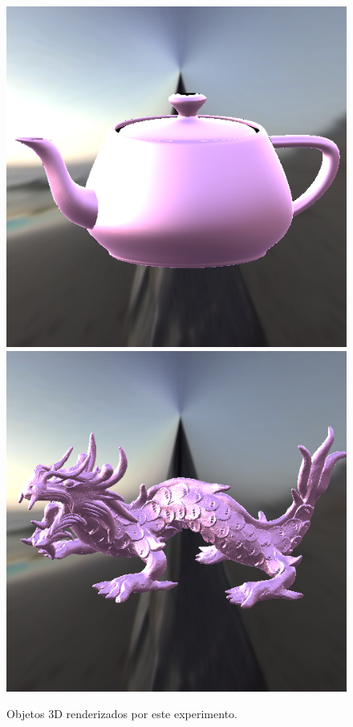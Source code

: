 \begin{figure}[H]
    \caption{\small{Objetos 3D renderizados por este experimento.}}\label{fig-cook-torrance-alternative-eqlang}
  \includegraphics[width=\linewidth]{./Imagens/brdfs/cook-torrance-alternative-teapot.png}
\endminipage\hfill
{}
  \includegraphics[width=\linewidth]{./Imagens/brdfs/cook-torrance-alternative-dragon.png}

\end{figure}
